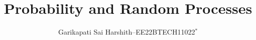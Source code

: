 \documentclass[journal,12pt,twocolumn]{IEEEtran}
\theoremstyle{remark}
\begin{document}
%

\vspace{3cm}
\title{
Probability and Random Processes
}
\author{ Garikapati Sai Harshith--EE22BTECH11022$^{*}$%
}
%
%
%
% 
%
% 
\end{document}
